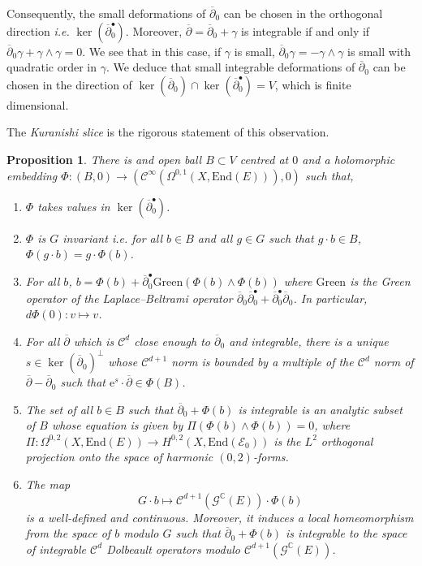 \documentclass{article}
\newtheorem{proposition}[theorem]{Proposition}
\theoremstyle{remark}
\theoremstyle{definition}
\newcommand{\C}{\mathbb{C}}
\newcommand{\End}{\mathrm{End}}
\newcommand{\e}{\boldsymbol{\mathrm{e}}}
\newcommand{\E}{\mathcal{E}}
\newcommand{\G}{\mathcal{G}}
\newcommand{\mC}{\mathcal{C}}
\newcommand{\dbar}{\overline{\partial}}
\begin{document}
Consequently, the small deformations of $\dbar_0$ can be chosen in the orthogonal direction \textit{i.e.} $\ker(\dbar_0^\bullet)$. Moreover, $\dbar = \dbar_0 + \gamma$ is integrable if and only if $\dbar_0\gamma + \gamma \wedge \gamma = 0$. We see that in this case, if $\gamma$ is small, $\dbar_0\gamma = -\gamma \wedge \gamma$ is small with quadratic order in $\gamma$. We deduce that small integrable deformations of $\dbar_0$ can be chosen in the direction of $\ker(\dbar_0) \cap \ker(\dbar_0^\bullet) = V$, which is finite dimensional.

The \textit{Kuranishi slice} is the rigorous statement of this observation.

\begin{proposition}\label{PRO:Propriétés Kuranishi}
    There is and open ball $B \subset V$ centred at $0$ and a holomorphic embedding $\Phi : (B,0) \rightarrow (\mC^\infty(\Omega^{0,1}(X,\End(E))),0)$ such that,
    \begin{enumerate}
        \item $\Phi$ takes values in $\ker(\dbar_0^\bullet)$.
        \item $\Phi$ is $G$ invariant \textit{i.e.} for all $b \in B$ and all $g \in G$ such that $g \cdot b \in B$, $\Phi(g \cdot b) = g \cdot \Phi(b)$.
        \item For all $b$, $b = \Phi(b) + \dbar_0^\bullet\mathrm{Green}(\Phi(b) \wedge \Phi(b))$ where $\mathrm{Green}$ is the Green operator of the Laplace--Beltrami operator $\dbar_0\dbar_0^\bullet + \dbar_0^\bullet\dbar_0$. In particular, $d\Phi(0) : v \mapsto v$.
        \item For all $\dbar$ which is $\mC^d$ close enough to $\dbar_0$ and integrable, there is a unique $s \in \ker(\dbar_0)^\bot$ whose $\mC^{d + 1}$ norm is bounded by a multiple of the $\mC^d$ norm of $\dbar - \dbar_0$ such that $\e^s \cdot \dbar \in \Phi(B)$.
        \item The set of all $b \in B$ such that $\dbar_0 + \Phi(b)$ is integrable is an analytic subset of $B$ whose equation is given by $\Pi(\Phi(b) \wedge \Phi(b)) = 0$, where $\Pi : \Omega^{0,2}(X,\End(E)) \rightarrow H^{0,2}(X,\End(\E_0))$ is the $L^2$ orthogonal projection onto the space of harmonic $(0,2)$-forms.
        \item The map
        $$
        G \cdot b \mapsto \mC^{d + 1}(\G^\C(E)) \cdot \Phi(b)
        $$
        is a well-defined and continuous. Moreover, it induces a local homeomorphism from the space of $b$ modulo $G$ such that $\dbar_0 + \Phi(b)$ is integrable to the space of integrable $\mC^d$ Dolbeault operators modulo $\mC^{d + 1}(\G^\C(E))$.
    \end{enumerate}
\end{proposition}
\end{document}
